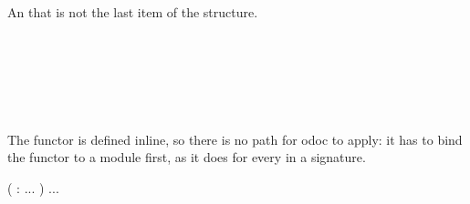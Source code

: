 \\
\label{Oxcaml_impl--module-Include_functor_not_last}\label{Oxcaml_impl-Include_functor_not_last}\begin{ocamlindent}\label{Oxcaml_impl-Include_functor_not_last--module-Make}\begin{ocamlindent}An  that is not the last item of the structure.\end{ocamlindent}%
\medbreak
\label{Oxcaml_impl-Include_functor_not_last--type-t}\\
 \hyperref[Oxcaml_impl-Include_functor_not_last-Make]{}\label{Oxcaml_impl-Include_functor_not_last--type-included}\\
\label{Oxcaml_impl-Include_functor_not_last--type-after}\\
\end{ocamlindent}%
\\
\label{Oxcaml_impl--module-Anonymous_functor}\label{Oxcaml_impl-Anonymous_functor}\begin{ocamlindent}\label{Oxcaml_impl-Anonymous_functor--type-t}\begin{ocamlindent}The functor is defined inline, so there is no path for odoc to apply: it has to bind the functor to a module first, as it does for every  in a signature.\end{ocamlindent}%
\medbreak
{}  (\hyperref[Oxcaml_impl-Anonymous_functor-argument-1-T]{} :  .\allowbreak{}.\allowbreak{}.\allowbreak{} )   .\allowbreak{}.\allowbreak{}.\allowbreak{} \label{Oxcaml_impl-Anonymous_functor--type-included}\\
\end{ocamlindent}%
\\


